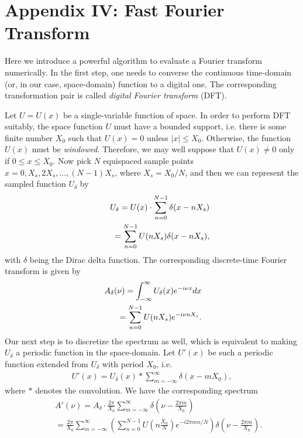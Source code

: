 \section*{Appendix IV: Fast Fourier Transform}
Here we introduce a powerful algorithm to evaluate a Fourier transform numerically. In the first step, one needs to converse the continuous time-domain (or, in our case, space-domain) function to a digital one. The corresponding transformation pair is called {\em digital Fourier transform} (DFT).

Let $U = U(x)$ be a single-variable function of space. In order to perform DFT suitably, the space function $U$ must have a bounded support, i.e. there is some finite number $X_0$ such that $U(x) = 0$ unless $|x| \leq X_0$. Otherwise, the function $U(x)$ must be {\em windowed}. Therefore, we may well suppose that $U(x) \neq 0$ only if $0 \leq x \leq X_0$. Now pick $N$ equispaced sample points $x = 0, X_s, 2X_s, \dots, (N-1)X_s$, where $X_s = X_0/N$, and then we can represent the sampled function $U_{\delta}$ by
\begin{eqnarray}
	&&U_{\delta} = U(x) \cdot \sum_{n = 0}^{N-1} \delta(x - n X_s)
	\nonumber\\
	&&\hspace{0.2in} = \sum_{n = 0}^{N-1} U(n X_s) \delta(x - n X_s),
\end{eqnarray}
with $\delta$ being the Dirac delta function. The corresponding discrete-time Fourier transform is given by
\begin{eqnarray}
	A_{\delta}(\nu) = \int_{-\infty}^{\infty} U_{\delta}(x) e^{-i \nu x} dx
	\nonumber\\
	\hspace{0.3in} = \sum_{n = 0}^{N - 1} U(n X_s) e^{-i \nu n X_s}.
\end{eqnarray}
Our next step is to discretize the spectrum as well, which is equivalent to making $U_{\delta}$ a periodic function in the space-domain. Let $U'(x)$ be such a periodic function extended from $U_{\delta}$ with period $X_0$, i.e.
\begin{eqnarray}
	U'(x) = U_{\delta}(x) * \sum_{m = -\infty}^{\infty} \delta(x - m X_0),
\end{eqnarray}
where $*$ denotes the convolution. We have the corresponding spectrum
\begin{eqnarray}
	&& A'(\nu) = A_{\delta} \cdot \frac{2\pi}{X_0} \sum_{m = -\infty}^{\infty} \delta(\nu - \frac{2\pi m}{X_0})
	\nonumber\\
	&&= \frac{2\pi}{X_0} \sum_{m = -\infty}^{\infty} \left(\sum_{n = 0}^{N - 1}
		U(n \frac{X_0}{N}) e^{-i 2\pi m n/ N}\right) \delta(\nu - \frac{2\pi m}{X_0}).
	\nonumber
\end{eqnarray}
